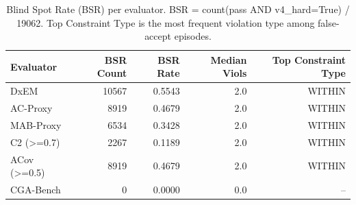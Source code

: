 \begin{table}[htbp]
\centering
\caption{Blind Spot Rate (BSR) per evaluator. BSR = count(pass AND v4\_hard=True) / 19062. Top Constraint Type is the most frequent violation type among false-accept episodes.}
\label{tab:bsr_by_evaluator}
\begin{tabular}{lrrrr}
\toprule
Evaluator & BSR Count & BSR Rate & Median Viols & Top Constraint Type \\
\midrule
DxEM & 10567 & 0.5543 & 2.0 & WITHIN \\
AC-Proxy & 8919 & 0.4679 & 2.0 & WITHIN \\
MAB-Proxy & 6534 & 0.3428 & 2.0 & WITHIN \\
C2 (>=0.7) & 2267 & 0.1189 & 2.0 & WITHIN \\
ACov (>=0.5) & 8919 & 0.4679 & 2.0 & WITHIN \\
CGA-Bench & 0 & 0.0000 & 0.0 & -- \\
\bottomrule
\end{tabular}
\end{table}
